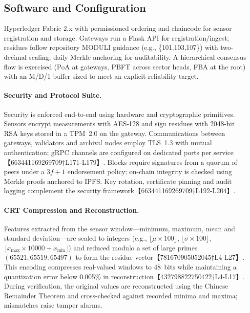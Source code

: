\subsection{Software and Configuration}
Hyperledger Fabric 2.x with permissioned ordering and chaincode for sensor registration and storage. Gateways run a Flask API for registration/ingest; residues follow repository MODULI guidance (e.g., \{101,103,107\}) with two-decimal scaling; daily Merkle anchoring for auditability. A hierarchical consensus flow is exercised (PoA at gateways, PBFT across sector heads, FBA at the root) with an M/D/1 buffer sized to meet an explicit reliability target.\ %

\paragraph{Security and Protocol Suite.}  Security is enforced end-to-end using hardware and cryptographic primitives.  Sensors encrypt measurements with AES‑128 and sign residues with 2048‑bit RSA keys stored in a TPM~2.0 on the gateway.  Communications between gateways, validators and archival nodes employ TLS~1.3 with mutual authentication; gRPC channels are configured on dedicated ports per service【663441169269709†L171-L179】.  Blocks require signatures from a quorum of peers under a $3f+1$ endorsement policy; on-chain integrity is checked using Merkle proofs anchored to IPFS.  Key rotation, certificate pinning and audit logging complement the security framework【663441169269709†L192-L204】.

\paragraph{CRT Compression and Reconstruction.}  Features extracted from the sensor window—minimum, maximum, mean and standard deviation—are scaled to integers (e.g., $\lfloor\mu \times 100\rfloor$, $\lfloor\sigma \times 100\rfloor$, $\lfloor x_{\max}\times 10000 + x_{\min}\rfloor$) and reduced modulo a set of large primes $(65521,65519,65497)$ to form the residue vector【781670905052045†L4-L27】.  This encoding compresses real-valued windows to 48~bits while maintaining a quantization error below 0.005\% in reconstruction【432798822750422†L4-L17】.  During verification, the original values are reconstructed using the Chinese Remainder Theorem and cross-checked against recorded minima and maxima; mismatches raise tamper alarms.

